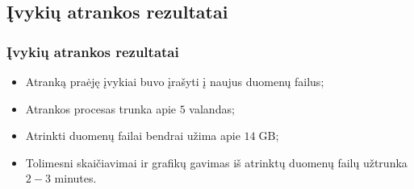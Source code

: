 \documentclass[xcolor=dvipsnames]{beamer}
\begin{document}
\begin{frame}
	\section{Įvykių atrankos rezultatai}
	\frametitle{Įvykių atrankos rezultatai}
	\begin{itemize}
		\item Atranką praėję įvykiai buvo įrašyti į naujus duomenų failus;
		\item Atrankos procesas trunka apie $5$ valandas;
		\item Atrinkti duomenų failai bendrai užima apie $14 \; \mathrm{GB}$;
		\item Tolimesni skaičiavimai ir grafikų gavimas iš atrinktų duomenų failų užtrunka $2-3$ minutes.
	\end{itemize}
\end{frame}
\end{document}
